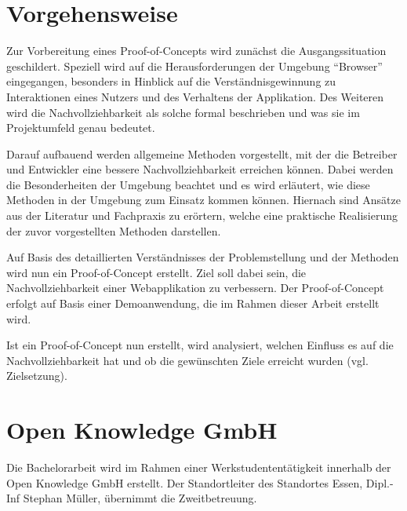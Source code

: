 \section{Vorgehensweise}

\vspace{-0.5\baselineskip}

Zur Vorbereitung eines Proof-of-Concepts wird zunächst die Ausgangssituation geschildert. Speziell wird auf die Herausforderungen der Umgebung \enquote{Browser} eingegangen, besonders in Hinblick auf die Verständnisgewinnung zu Interaktionen eines Nutzers und des Verhaltens der Applikation. Des Weiteren wird die Nachvollziehbarkeit als solche formal beschrieben und was sie im Projektumfeld genau bedeutet.

Darauf aufbauend werden allgemeine Methoden vorgestellt, mit der die Betreiber und Entwickler eine bessere Nachvollziehbarkeit erreichen können. Dabei werden die Besonderheiten der Umgebung beachtet und es wird erläutert, wie diese Methoden in der Umgebung zum Einsatz kommen können. Hiernach sind Ansätze aus der Literatur und Fachpraxis zu erörtern, welche eine praktische Realisierung der zuvor vorgestellten Methoden darstellen.

Auf Basis des detaillierten Verständnisses der Problemstellung und der Methoden wird nun ein Proof-of-Concept erstellt. Ziel soll dabei sein, die Nachvollziehbarkeit einer Webapplikation zu verbessern. Der Proof-of-Concept erfolgt auf Basis einer Demoanwendung, die im Rahmen dieser Arbeit erstellt wird.

Ist ein Proof-of-Concept nun erstellt, wird analysiert, welchen Einfluss es auf die Nachvollziehbarkeit hat und ob die gewünschten Ziele erreicht wurden (vgl. Zielsetzung).

\vspace{-0.5\baselineskip}

\section{Open Knowledge GmbH}

\vspace{-0.5\baselineskip}


Die Bachelorarbeit wird im Rahmen einer Werkstudententätigkeit innerhalb der Open Knowledge GmbH erstellt. Der Standortleiter des Standortes Essen, Dipl.-Inf Stephan Müller, übernimmt die Zweitbetreuung.


